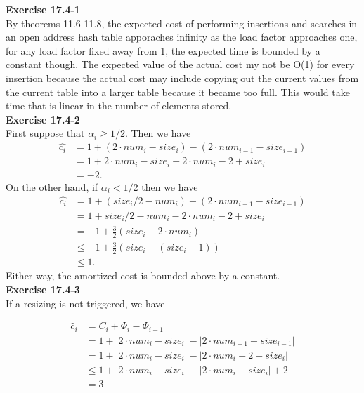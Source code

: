 \documentclass{article}
\begin{document}
\noindent\textbf{Exercise 17.4-1}\\

By theorems 11.6-11.8, the expected cost of performing insertions and searches in an open address hash table apporaches infinity as the load factor approaches one, for any load factor fixed away from 1, the expected time is bounded by a constant though. The expected value of the actual cost my not be O(1) for every insertion because the actual cost may include copying out the current values from the current table into a larger table because it became too full. This would take time that is linear in the number of elements stored.\\

\noindent\textbf{Exercise 17.4-2}\\

First suppose that $\alpha_i \geq 1/2$.  Then we have
\begin{align*}
\hat{c_i} &= 1 + (2\cdot num_i - size_i) - (2\cdot num_{i-1} - size_{i-1}) \\
&=  1 + 2\cdot num_i - size_i - 2 \cdot num_i - 2 + size_i \\
&= -2.
\end{align*}
On the other hand, if $\alpha_i < 1/2$ then we have
\begin{align*}
\hat{c_i} &= 1 + (size_i/2 - num_i) - (2\cdot num_{i-1} - size_{i-1}) \\
&= 1 + size_i/2 - num_i - 2\cdot num_i - 2 + size_i \\
&= -1 + \frac{3}{2}(size_i - 2\cdot num_i)\\
&\leq -1 + \frac{3}{2}(size_i - (size_i - 1)) \\
&\leq 1.
\end{align*}
Either way, the amortized cost is bounded above by a constant. \\

\noindent\textbf{Exercise 17.4-3}\\

If a resizing is not triggered, we have

\begin{align*}
\hat{c}_i & = C_i + \Phi_i-\Phi_{i-1}\\
&= 1 + |2\cdot num_i - size_i| - |2\cdot num_{i-1} - size_{i-1}|\\
&= 1 + |2\cdot num_i - size_i| - |2\cdot num_i + 2  - size_{i}|\\
&\le 1 + |2\cdot num_i - size_i| - |2\cdot num_i  - size_{i}| + 2\\
&= 3
\end{align*}
\end{document}
